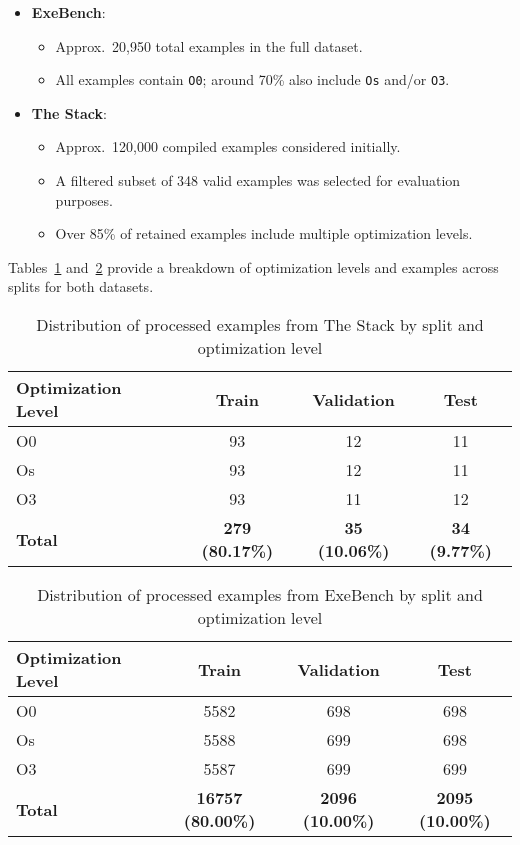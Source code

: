 \documentclass[../main.tex]{subfiles}
\begin{document}
\begin{itemize}
    \item \textbf{ExeBench}:
    \begin{itemize}
        \item Approx.\ 20,950 total examples in the full dataset.
        \item All examples contain \texttt{O0}; around 70\% also include \texttt{Os} and/or \texttt{O3}.
    \end{itemize}
    \item \textbf{The Stack}:
    \begin{itemize}
        \item Approx.\ 120,000 compiled examples considered initially.
        \item A filtered subset of 348 valid examples was selected for evaluation purposes.
        \item Over 85\% of retained examples include multiple optimization levels.
    \end{itemize}
\end{itemize}

Tables~\ref{tab:stack_dist} and~\ref{tab:exebench_dist} provide a breakdown of optimization levels and examples across splits for both datasets.

\vspace{1em}

\begin{table}[H]
\centering
\caption{Distribution of processed examples from The Stack by split and optimization level}
\label{tab:stack_dist}
\begin{tabular}{lccc}
\toprule
\textbf{Optimization Level} & \textbf{Train} & \textbf{Validation} & \textbf{Test} \\
\midrule
O0 & 93 & 12 & 11 \\
Os & 93 & 12 & 11 \\
O3 & 93 & 11 & 12 \\
\midrule
\textbf{Total} & \textbf{279 (80.17\%)} & \textbf{35 (10.06\%)} & \textbf{34 (9.77\%)} \\
\bottomrule
\end{tabular}
\end{table}

\vspace{1em}

\begin{table}[H]
\centering
\caption{Distribution of processed examples from ExeBench by split and optimization level}
\label{tab:exebench_dist}
\begin{tabular}{lccc}
\toprule
\textbf{Optimization Level} & \textbf{Train} & \textbf{Validation} & \textbf{Test} \\
\midrule
O0 & 5582 & 698 & 698 \\
Os & 5588 & 699 & 698 \\
O3 & 5587 & 699 & 699 \\
\midrule
\textbf{Total} & \textbf{16757 (80.00\%)} & \textbf{2096 (10.00\%)} & \textbf{2095 (10.00\%)} \\
\bottomrule
\end{tabular}
\end{table}
\end{document}
